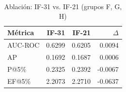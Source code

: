 \begin{table}[htbp]
\centering
\small
\caption{Ablación: IF-31 vs. IF-21 (grupos F, G, H)}
\label{tab:ablation-31vs21}
\begin{tabular}{lrrr}
\toprule
Métrica & IF-31 & IF-21 & $\Delta$ \\
\midrule
  AUC-ROC & 0.6299 & 0.6205 & 0.0094 \\
  AP & 0.1692 & 0.1687 & 0.0006 \\
  P@5\% & 0.2325 & 0.2392 & -0.0067 \\
  EF@5\% & 2.2073 & 2.2710 & -0.0637 \\
\bottomrule
\end{tabular}
\end{table}
